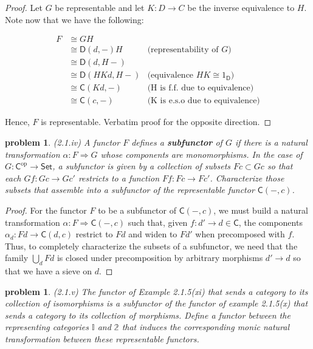 \documentclass[10pt, oneside]{article}   	%
\newcommand{\cat}[1]{\mathsf{#1}}
\newcommand{\cc}{\cat{C}}
\newcommand{\dd}{\cat{D}}
\newcommand{\cset}{\cat{Set}}
\newcommand{\op}[1]{#1^{\text{op}}}
\newcommand{\opc}{\op{\cc}}
\newcommand{\nt}{\Rightarrow}
\newcommand{\two}{\mathbb{2}}
\newtheorem{problem}[theorem]{problem}
\begin{document}
\begin{proof}
Let $G$ be representable and let $K : D \to C$ be the inverse equivalence to $H$. Note now that we have the following: 
	
\begin{center}
\begin{equation}
	\begin{aligned}
		F &\cong GH \\
		 &\cong \dd(d, -)H & \text{(representability of $G$)} \\
		 &\cong \dd(d, H-)  \\ 
		 &\cong \dd(HKd, H-) & \text{(equivalence $HK \cong 1_\dd$)} \\
		 &\cong \cc(Kd, -) & \text{(H is f.f. due to equivalence)} \\
		 &\cong \cc(c, -) & \text{(K is e.s.o due to equivalence)}
	\end{aligned}
\end{equation}
\end{center}

Hence, $F$ is representable. Verbatim proof for the opposite direction.
\end{proof}
	
\begin{problem} (2.1.iv) A functor $F$ defines a \textbf{subfunctor} of $G$ if there is a natural transformation $\alpha: F \nt G$ whose components are monomorphisms. In the case of $G: \opc \to \cset$, a subfunctor is given by a collection of subsets $Fc \subset Gc$ so that each $Gf : Gc \to Gc'$ restricts to a function $Ff : Fc \to Fc'$. Characterize those subsets that assemble into a subfunctor of the representable functor $\cc(-, c)$.

\end{problem}

\begin{proof}

For the functor $F$ to be a subfunctor of $\cc(-, c)$, we must build a natural transformation $\alpha : F \nt \cc(-, c)$ such that, given $f : d' \to d \in \cc$,  the components $\alpha_d : Fd \to \cc(d, c)$ restrict to $Fd$ and widen to $Fd'$ when precomposed with $f$. Thus, to completely characterize the subsets of a subfunctor, we need that the family $\bigcup_d Fd$ is closed under precomposition by arbitrary morphisms $d' \to d$ so that we have a sieve on $d$.
\end{proof} 

\begin{problem} (2.1.v) The functor of Example 2.1.5(xi) that sends a category to its collection of isomorphisms is a subfunctor of the functor of example 2.1.5(x) that sends a category to its collection of morphisms. Define a functor between the representing categories $\mathbb{I}$ and $\two$ that induces the corresponding monic natural transformation between these representable functors. 

\end{problem}
\end{document}
